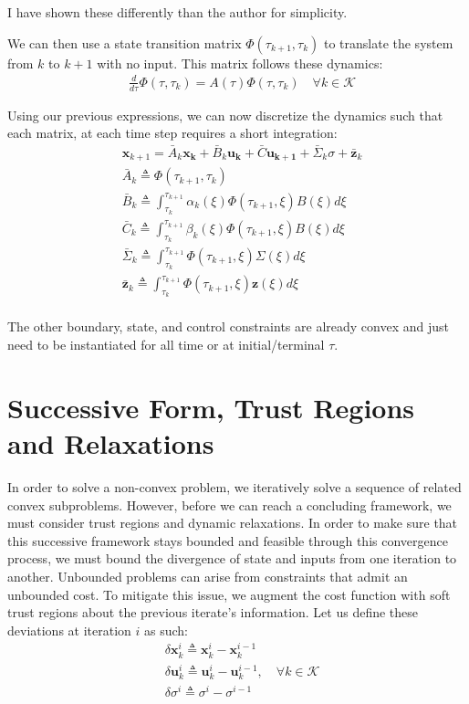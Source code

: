I have shown these differently than the author for simplicity.

We can then use a state transition matrix $\Phi(\tau_{k+1},\tau_k)$ to translate the system from $k$ to $k+1$ with no input. This matrix follows these dynamics:
\begin{align}
& \frac{d}{d\tau} \Phi(\tau,\tau_k) = A(\tau) \Phi(\tau,\tau_k) \quad \forall k \in \mathcal{K}
\end{align}

Using our previous expressions, we can now discretize the dynamics such that each matrix, at each time step requires a short integration:
 \begin{align}
& \mathbf{x}_{k+1} = \bar{A}_k\mathbf{x_k} + \bar{B}_k\mathbf{u_k} + \bar{C}\mathbf{u_{k+1}} + \bar{\Sigma}_k\sigma + \bar{\mathbf{z}}_k  \\
& \bar{A}_k \triangleq  \Phi(\tau_{k+1},\tau_k)\\
& \bar{B}_k \triangleq \int_{\tau_k}^{\tau_{k+1}} \alpha_k(\xi) \Phi(\tau_{k+1},\xi) B(\xi) d\xi\\
& \bar{C}_k \triangleq \int_{\tau_k}^{\tau_{k+1}} \beta_k(\xi) \Phi(\tau_{k+1},\xi) B(\xi)  d\xi\\
& \bar{\Sigma}_k \triangleq \int_{\tau_k}^{\tau_{k+1}} \Phi(\tau_{k+1},\xi) \Sigma(\xi) d\xi\\
& \bar{\mathbf{z}}_k \triangleq \int_{\tau_k}^{\tau_{k+1}} \Phi(\tau_{k+1},\xi) \mathbf{z}(\xi) d\xi\\
\end{align}

The other boundary, state, and control constraints are already convex and just need to be instantiated for all time or at initial/terminal $\tau$.


\section{Successive Form, Trust Regions and Relaxations}
In order to solve a non-convex problem, we iteratively solve a sequence of related convex subproblems. However, before we can reach a concluding framework, we must consider trust regions and dynamic relaxations. In order to make sure that this successive framework stays bounded and feasible through this convergence process, we must bound the divergence of state and inputs from one iteration to another. Unbounded problems can arise from constraints that admit an unbounded cost. To mitigate this issue, we augment the cost function with soft trust regions about the previous iterate's information. Let us define these deviations at iteration $i$ as such:
\begin{align}
& \delta \mathbf{x}_k^i \triangleq \mathbf{x}_k^i - \mathbf{x}_k^{i-1} \\
& \delta \mathbf{u}_k^i \triangleq \mathbf{u}_k^i - \mathbf{u}_k^{i-1}, \quad \forall k \in \mathcal{K}\\
& \delta \sigma^i \triangleq \sigma^i - \sigma^{i-1}
\end{align}

